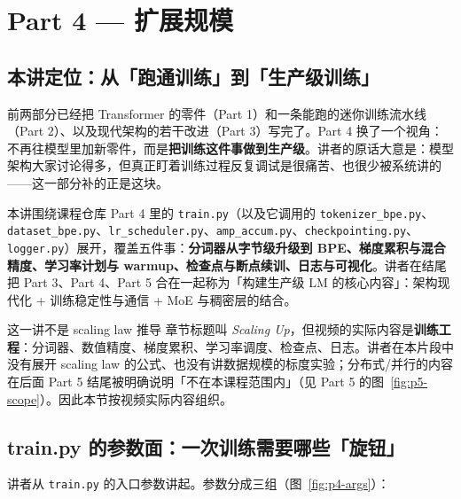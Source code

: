 
\section{Part 4 — 扩展规模}

\subsection{本讲定位：从「跑通训练」到「生产级训练」}

前两部分已经把 Transformer 的零件（Part 1）和一条能跑的迷你训练流水线（Part 2）、以及现代架构的若干改进（Part 3）写完了。Part 4 换了一个视角：不再往模型里加新零件，而是\textbf{把训练这件事做到生产级}。讲者的原话大意是：模型架构大家讨论得多，但真正盯着训练过程反复调试是很痛苦、也很少被系统讲的——这一部分补的正是这块。

本讲围绕课程仓库 Part 4 里的 \texttt{train.py}（以及它调用的 \texttt{tokenizer\_bpe.py}、\texttt{dataset\_bpe.py}、\texttt{lr\_scheduler.py}、\texttt{amp\_accum.py}、\texttt{checkpointing.py}、\texttt{logger.py}）展开，覆盖五件事：\textbf{分词器从字节级升级到 BPE、梯度累积与混合精度、学习率计划与 warmup、检查点与断点续训、日志与可视化}。讲者在结尾把 Part 3、Part 4、Part 5 合在一起称为「构建生产级 LM 的核心内容」：架构现代化 + 训练稳定性与通信 + MoE 与稠密层的结合。

\begin{knowledgebox}{这一讲不是 scaling law 推导}
章节标题叫 \emph{Scaling Up}，但视频的实际内容是\textbf{训练工程}：分词器、数值精度、梯度累积、学习率调度、检查点、日志。讲者在本片段中没有展开 scaling law 的公式、也没有讲数据规模的标度实验；分布式/并行的内容在后面 Part 5 结尾被明确说明「不在本课程范围内」（见 Part 5 的图~\ref{fig:p5-scope}）。因此本节按视频实际内容组织。
\end{knowledgebox}

\subsection{train.py 的参数面：一次训练需要哪些「旋钮」}

讲者从 \texttt{train.py} 的入口参数讲起。参数分成三组（图~\ref{fig:p4-args}）：

